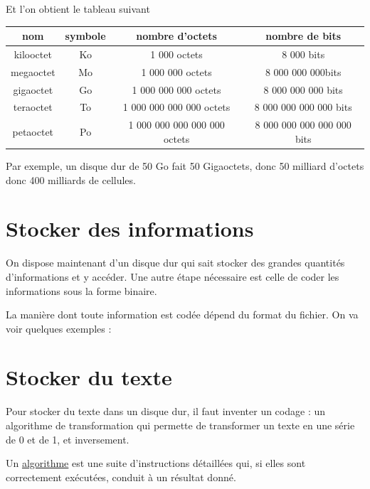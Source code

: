 \documentclass[10pt,a4paper]{book}
\begin{document}
Et l'on obtient le tableau suivant

\begin{center}
    \begin{tabular}{|c|c|c|c|}
         \hline
         nom & symbole  &nombre d'octets &  nombre de bits \\
         \hline
         kilooctet & Ko &1 000 octets & 8 000 bits \\
         \hline
         megaoctet & Mo & 1 000 000 octets& 8 000 000 000bits  \\
         \hline
         gigaoctet & Go & 1 000 000 000 octets&  8 000 000 000 bits  \\
         \hline
         teraoctet & To & 1 000 000 000 000 octets&  8 000 000 000 000 bits  \\
         \hline
         petaoctet & Po & 1 000 000 000 000 000 octets&  8 000 000 000 000 000 bits  \\
         \hline
    \end{tabular}
\end{center}

Par exemple, un disque dur de 50 Go fait 50 Gigaoctets, donc 50 milliard d'octets donc 400 milliards de cellules. 



\section{Stocker des informations}

On dispose maintenant d'un disque dur qui sait stocker des grandes quantités d'informations et y accéder. Une autre étape nécessaire est celle de coder les informations sous la forme binaire.

La manière dont toute information est codée dépend du format du fichier. On va voir quelques exemples :

\section{Stocker du texte}

Pour stocker du texte dans un disque dur, il faut inventer un codage : un algorithme de transformation qui permette de transformer un texte en une série de 0 et de 1, et inversement.

\begin{de}
Un \underline{algorithme} est une suite d'instructions détaillées qui, si elles sont correctement exécutées, conduit à un résultat donné. 
\end{de}
\end{document}

